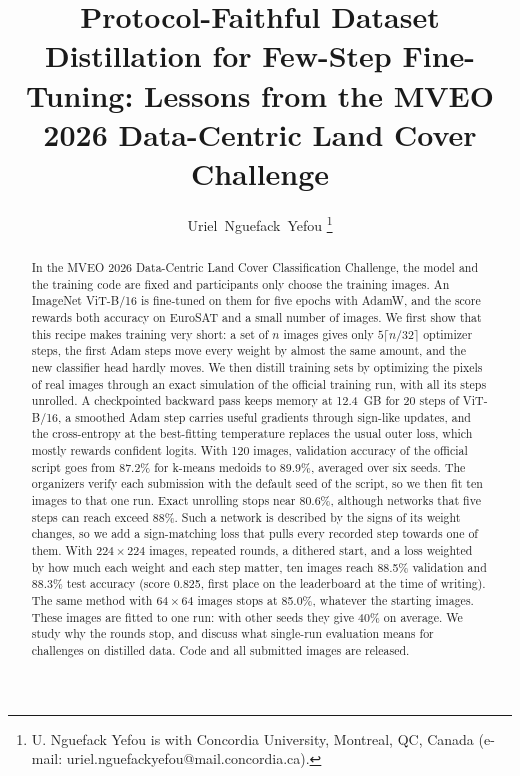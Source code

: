 \documentclass[journal]{IEEEtran}
\begin{document}
\title{Protocol-Faithful Dataset Distillation for Few-Step Fine-Tuning: Lessons from the MVEO 2026 Data-Centric Land Cover Challenge}

\author{Uriel~Nguefack~Yefou%
\thanks{U. Nguefack Yefou is with Concordia University, Montreal, QC, Canada
(e-mail: uriel.nguefackyefou@mail.concordia.ca).}}


\maketitle

\begin{abstract}
In the MVEO 2026 Data-Centric Land Cover Classification Challenge, the model and the training code are fixed and
participants only choose the training images. An ImageNet ViT-B/16 is fine-tuned on them for five epochs with
AdamW, and the score rewards both accuracy on EuroSAT and a small number of images. We first show that this recipe
makes training very short: a set of $n$ images gives only $5\lceil n/32\rceil$ optimizer steps, the first Adam
steps move every weight by almost the same amount, and the new classifier head hardly moves. We then distill
training sets by optimizing the pixels of real images through an exact simulation of the official training run,
with all its steps unrolled. A checkpointed backward pass keeps memory at 12.4~GB for 20 steps of ViT-B/16, a
smoothed Adam step carries useful gradients through sign-like updates, and the cross-entropy at the best-fitting
temperature replaces the usual outer loss, which mostly rewards confident logits. With 120 images, validation
accuracy of the official script goes from 87.2\% for k-means medoids to 89.9\%, averaged over six seeds. The
organizers verify each submission with the default seed of the script, so we then fit ten images to that one run.
Exact unrolling stops near 80.6\%, although networks that five steps can reach exceed 88\%. Such a network is
described by the signs of its weight changes, so we add a sign-matching loss that pulls every recorded step
towards one of them. With $224\times224$ images, repeated rounds, a dithered start, and a loss weighted by how much
each weight and each step matter, ten images reach 88.5\% validation and 88.3\% test accuracy (score 0.825, first
place on the leaderboard at the time of writing). The same method with $64\times64$ images stops at 85.0\%, whatever
the starting images. These images are fitted to one run: with other seeds they give 40\% on average. We study
why the rounds stop, and discuss what single-run evaluation means for challenges on distilled data. Code and all
submitted images are released.
\end{abstract}
\end{document}
